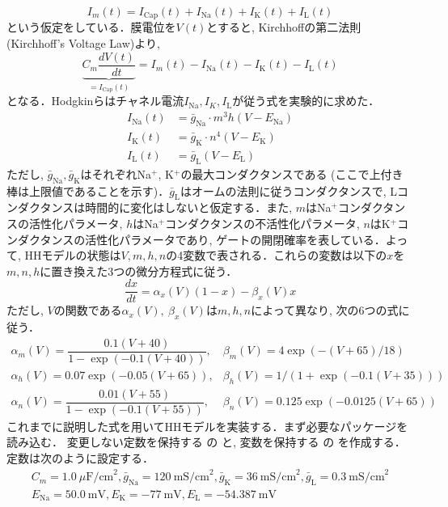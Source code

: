 \begin{equation}
I_{m}(t)=I_\text{Cap}(t)+I_\text{Na}(t)+I_\text{K}(t)+I_\text{L}(t)    
\end{equation}
という仮定をしている．膜電位を$V(t)$とすると, Kirchhoffの第二法則 (Kirchhoff's Voltage Law)より, 
\begin{equation}
\underbrace{C_m\frac {dV(t)}{dt}}_{= I_\text{Cap} (t)}=I_{m}(t)-I_\text{Na}(t)-I_\text{K}(t)-I_\text{L}(t)
\end{equation}
となる．Hodgkinらはチャネル電流$I_\text{Na}, I_K, I_\text{L}$が従う式を実験的に求めた．
\begin{align}
I_\text{Na}(t) &= \bar{g}_{\text{Na}}\cdot m^{3}h(V-E_{\text{Na}})\\
I_\text{K}(t) &= \bar{g}_{\text{K}}\cdot n^{4}(V-E_{\text{K}})\\
I_\text{L}(t) &= \bar{g}_{\text{L}}(V-E_{\text{L}})
\end{align}
ただし, $\bar{g}_{\text{Na}}, \bar{g}_{\text{K}}$はそれぞれNa$^+$, K$^+$の最大コンダクタンスである (ここで上付き棒は上限値であることを示す)．$\bar{g}_{\text{L}}$はオームの法則に従うコンダクタンスで, Lコンダクタンスは時間的に変化はしないと仮定する．また, $m$はNa$^+$コンダクタンスの活性化パラメータ, $h$はNa$^+$コンダクタンスの不活性化パラメータ, $n$はK$^+$コンダクタンスの活性化パラメータであり, ゲートの開閉確率を表している．よって, HHモデルの状態は$V, m, h, n$の4変数で表される．これらの変数は以下の$x$を$m, n, h$に置き換えた3つの微分方程式に従う． 
\begin{equation}
\frac{dx}{dt}=\alpha_{x}(V)(1-x)-\beta_{x}(V)x
\end{equation}
ただし, $V$の関数である$\alpha_{x}(V),\ \beta_{x}(V)$は$m, h, n$によって異なり, 次の6つの式に従う．
\begin{equation}
\begin{array}{ll}
\alpha_{m}(V)=\dfrac {0.1(V+40)}{1-\exp (-0.1(V+40))}, &\beta_{m}(V)=4\exp {(-(V+65)/18)}\\
\alpha_{h}(V)=0.07\exp {(-0.05(V+65))}, & \beta_{h}(V)=1/(1+{\exp {\left(-0.1(V+35)\right)}})\\
\alpha_{n}(V)={\dfrac {0.01(V+55)}{1-\exp {\left(-0.1(V+55)\right)}}},& \beta_{n}(V)=0.125\exp {(-0.0125(V+65))} 
\end{array}
\end{equation}
これまでに説明した式を用いてHHモデルを実装する．まず必要なパッケージを読み込む．
変更しない定数を保持する  の  と, 変数を保持する  の  を作成する．定数は次のように設定する． 
\begin{equation}
\begin{array}{l}
C_m=1.0\ \mu\textrm{F/cm}^2, \bar{g}_{\text{Na}}=120\ \textrm{mS/cm}^2, \bar{g}_{\text{K}}=36\ \textrm{mS/cm}^2, \bar{g}_{\text{L}}=0.3\ \textrm{mS/cm}^2\\
E_{\text{Na}}=50.0\ \textrm{mV}, E_{\text{K}}=-77\ \textrm{mV}, E_{\text{L}}=-54.387\ \textrm{mV} 
\end{array}
\end{equation}
